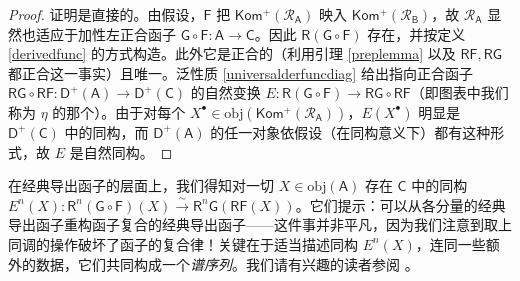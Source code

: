 \begin{proof}
	证明是直接的。由假设，$\mathsf{F}$ 把 $\mathsf{Kom^+(\mathcal{R}_\mathsf{A})}$ 映入 $\mathsf{Kom^+(\mathcal{R}_\mathsf{B})}$，故 $\mathcal{R}_\mathsf{A}$ 显然也适应于加性左正合函子 $\mathsf{G\circ F}:\mathsf{A}\rightarrow\mathsf{C}$。因此 $\mathsf{R(G\circ F)}$ 存在，并按定义 \ref{derivedfunc} 的方式构造。此外它是正合的（利用引理 \ref{preplemma} 以及 $\mathsf{RF}, \mathsf{RG}$ 都正合这一事实）且唯一。泛性质 \eqref{universalderfuncdiag} 给出指向正合函子 $\mathsf{RG\circ RF}:\mathsf{D^+(A)}\rightarrow\mathsf{D^+(C)}$ 的自然变换 $E:\mathsf{R(G\circ F)}\rightarrow \mathsf{RG\circ RF}$（即图表中我们称为 $\eta$ 的那个）。由于对每个 $X^\bullet\in\text{obj}(\mathsf{Kom^+(\mathcal{R}_\mathsf{A})})$，$E(X^\bullet)$ 明显是 $\mathsf{D^+(C)}$ 中的同构，而 $\mathsf{D^+(A)}$ 的任一对象依假设（在同构意义下）都有这种形式，故 $E$ 是自然同构。
\end{proof}

在经典导出函子的层面上，我们得知对一切 $X\in\text{obj}(\mathsf{A})$ 存在 $\mathsf{C}$ 中的同构 $E^n(X):\mathsf{R}^n(\mathsf{G\circ F})(X)\xrightarrow{\sim}\mathsf{R}^n\mathsf{G}(\mathsf{RF}(X))$。它们提示：可以从各分量的经典导出函子重构函子复合的经典导出函子——这件事并非平凡，因为我们注意到取上同调的操作破坏了函子的复合律！关键在于适当描述同构 $E^n(X)$，连同一些额外的数据，它们共同构成一个\textit{谱序列}。我们请有兴趣的读者参阅 \cite[section III.7]{[GM03]}。


\newpage

